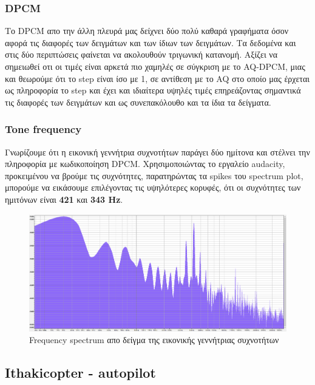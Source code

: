 \documentclass[hidelinks, 12pt, a4paper]{article}
\begin{document}
\subsubsection{DPCM}

Το DPCM απο την άλλη πλευρά μας δείχνει δύο πολύ καθαρά γραφήματα όσον αφορά τις διαφορές των δειγμάτων και των ίδιων των δειγμάτων. Τα δεδομένα και στις δύο περιπτώσεις φαίνεται να ακολουθούν τριγωνική κατανομή. Αξίζει να σημειωθεί οτι οι τιμές είναι αρκετά πιο χαμηλές σε σύγκριση με το AQ-DPCM, μιας και θεωρούμε ότι το step είναι ίσο με 1, σε αντίθεση με το AQ στο οποίο μας έρχεται ως πληροφορία το step και έχει και ιδιαίτερα υψηλές τιμές επηρεάζοντας σημαντικά τις διαφορές των δειγμάτων και ως συνεπακόλουθο και τα ίδια τα δείγματα.

\subsubsection{Tone frequency}

Γνωρίζουμε ότι η εικονική γεννήτρια συχνοτήτων παράγει δύο ημίτονα και στέλνει την πληροφορία με κωδικοποίηση DPCM. Χρησιμοποιώντας το εργαλείο audacity, προκειμένου να βρούμε τις συχνότητες, παρατηρώντας τα spikes του spectrum plot, μπορούμε να εικάσουμε επιλέγοντας τις υψηλότερες κορυφές, ότι οι συχνότητες των ημιτόνων είναι \textbf{421} και \textbf{343 Hz}.

\begin{figure}[h!]
\centering
	\includegraphics[height=.3\textheight, width=\textwidth]{assets/session1/spectrum.png}
    \caption{Frequency spectrum απο δείγμα της εικονικής γεννήτριας συχνοτήτων}
\end{figure}


\subsection{Ithakicopter - autopilot}
\end{document}
